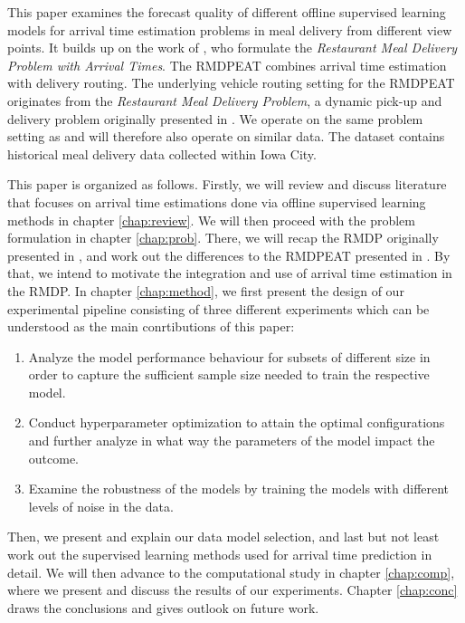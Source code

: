 This paper examines the forecast quality of different offline supervised learning models for arrival time estimation problems in meal delivery from different view points. It builds up on the work of \cite{Hildebrandt2020_EAT}, who formulate the \textit{Restaurant Meal Delivery Problem with Arrival Times}. The RMDPEAT combines arrival time estimation with delivery routing. The underlying vehicle routing setting for the RMDPEAT originates from the \textit{Restaurant Meal Delivery Problem}, a dynamic pick-up and delivery problem originally presented in \cite{UlmerRMDP}. We operate on the same problem setting as \cite{Hildebrandt2020_EAT} and will therefore also operate on similar data. The dataset contains historical meal delivery data collected within Iowa City.

This paper is organized as follows. Firstly, we will review and discuss literature that focuses on arrival time estimations done via offline supervised learning methods in chapter \ref{chap:review}. We will then proceed with the problem formulation in chapter \ref{chap:prob}. There, we will recap the RMDP originally presented in \cite{UlmerRMDP}, and work out the differences to the RMDPEAT presented in \cite{Hildebrandt2020_EAT}. By that, we intend to motivate the integration and use of arrival time estimation in the RMDP. In chapter \ref{chap:method}, we first present the design of our experimental pipeline consisting of three different experiments which can be understood as the main conrtibutions of this paper:
\begin{enumerate}
	\item Analyze the model performance behaviour for subsets of different size in order to capture the sufficient sample size needed to train the respective model.
	\item Conduct hyperparameter optimization to attain the optimal configurations and further analyze in what way the parameters of the model impact the outcome. 
	\item Examine the robustness of the models by training the models with different levels of noise in the data.
\end{enumerate}
Then, we present and explain our data model selection, and last but not least work out the supervised learning methods used for arrival time prediction in detail. We will then advance to the computational study in chapter \ref{chap:comp}, where we present and discuss the results of our experiments.
Chapter \ref{chap:conc} draws the conclusions and gives outlook on future work.
 